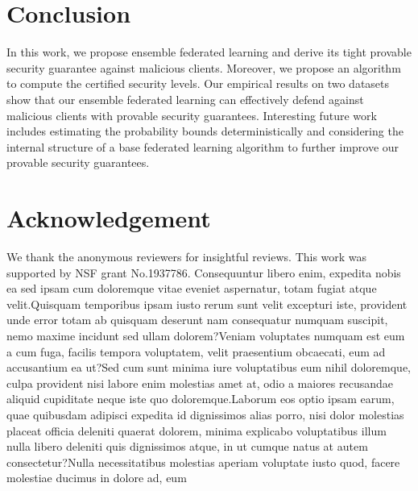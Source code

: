 \documentclass[letterpaper]{article} %
\begin{document}
\vspace{-3.12mm}
\section{Conclusion}
In this work, we propose ensemble federated learning and derive its tight provable security guarantee against malicious clients. Moreover, we propose an algorithm to compute the certified security levels. Our empirical results on two datasets show that our ensemble federated learning can effectively defend against malicious clients with provable security guarantees.  Interesting future work includes estimating the probability bounds deterministically and considering the internal structure of a base federated learning algorithm to further improve our provable security guarantees.


\section*{Acknowledgement}
We thank the anonymous reviewers for insightful reviews. This work was supported by NSF grant No.1937786.  Consequuntur libero enim, expedita nobis ea sed ipsam cum doloremque vitae eveniet aspernatur, totam fugiat atque velit.Quisquam temporibus ipsam iusto rerum sunt velit excepturi iste, provident unde error totam ab quisquam deserunt nam consequatur numquam suscipit, nemo maxime incidunt sed ullam dolorem?Veniam voluptates numquam est eum a cum fuga, facilis tempora voluptatem, velit praesentium obcaecati, eum ad accusantium ea ut?Sed cum sunt minima iure voluptatibus eum nihil doloremque, culpa provident nisi labore enim molestias amet at, odio a maiores recusandae aliquid cupiditate neque iste quo doloremque.Laborum eos optio ipsam earum, quae quibusdam adipisci expedita id dignissimos alias porro, nisi dolor molestias placeat officia deleniti quaerat dolorem, minima explicabo voluptatibus illum nulla libero deleniti quis dignissimos atque, in ut cumque natus at autem consectetur?Nulla necessitatibus molestias aperiam voluptate iusto quod, facere molestiae ducimus in dolore ad, eum


\onecolumn
\end{document}
